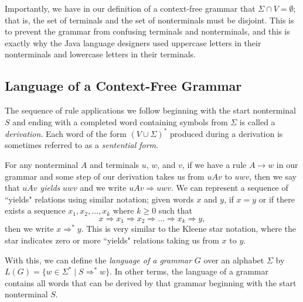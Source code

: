 Importantly, we have in our definition of a context-free grammar that $\Sigma \cap V = \emptyset$; that is, the set of terminals and the set of nonterminals must be disjoint. This is to prevent the grammar from confusing terminals and nonterminals, and this is exactly why the Java language designers used uppercase letters in their nonterminals and lowercase letters in their terminals.

\subsection{Language of a Context-Free Grammar}

The sequence of rule applications we follow beginning with the start nonterminal $S$ and ending with a completed word containing symbols from $\Sigma$ is called a \emph{derivation}. Each word of the form $(V \cup \Sigma)^{*}$ produced during a derivation is sometimes referred to as a \emph{sentential form}.

For any nonterminal $A$ and terminals $u$, $w$, and $v$, if we have a rule $A \rightarrow w$ in our grammar and some step of our derivation takes us from $uAv$ to $uwv$, then we say that $uAv$ \emph{yields} $uwv$ and we write $uAv \Rightarrow uwv$. We can represent a sequence of ``yields" relations using similar notation; given words $x$ and $y$, if $x = y$ or if there exists a sequence $x_{1}, x_{2}, \dots, x_{k}$ where $k \geq 0$ such that
\begin{equation*}
x \Rightarrow x_{1} \Rightarrow x_{2} \Rightarrow \dots \Rightarrow x_{k} \Rightarrow y,
\end{equation*}
then we write $x \Rightarrow^{*} y$. This is very similar to the Kleene star notation, where the star indicates zero or more ``yields" relations taking us from $x$ to $y$.

With this, we can define the \emph{language of a grammar} $G$ over an alphabet $\Sigma$ by $L(G) = \{w \in \Sigma^{*} \mid S \Rightarrow^{*} w\}$. In other terms, the language of a grammar contains all words that can be derived by that grammar beginning with the start nonterminal $S$.

